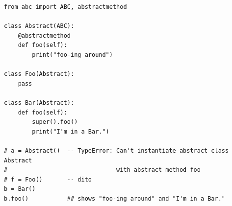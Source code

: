 
\begin{frame}[fragile]
%
\vspace{-3pt}
\begin{codebox}
\begin{verbatim}
from abc import ABC, abstractmethod

class Abstract(ABC):
    @abstractmethod
    def foo(self):
        print("foo-ing around")

class Foo(Abstract):
    pass

class Bar(Abstract):
    def foo(self):
        super().foo()
        print("I'm in a Bar.")

# a = Abstract()  -- TypeError: Can't instantiate abstract class Abstract 
#                               with abstract method foo
# f = Foo()       -- dito
b = Bar()
b.foo()           ## shows "foo-ing around" and "I'm in a Bar."
\end{verbatim}
\end{codebox}
%
\end{frame}


